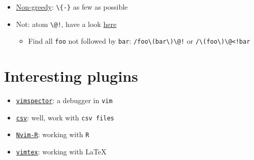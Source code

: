 \documentclass[a4paper,12pt,%
              final%
              ]{article}
\newcommand{\vim}{\texttt{vim}}
\begin{document}
\begin{itemize}
\begin{itemize}
      \item \href{http://vimregex.com/#Non-Greedy}{Non-greedy}: \verb|\{-}| as few as possible
      \item Not: atom \verb|\@!|, have a look \href{https://vim.fandom.com/wiki/Search_for_lines_not_containing_pattern_and_other_helpful_searches}{here}
        \begin{itemize}
          \item Find all \texttt{foo} not followed by \texttt{bar}: \verb|/foo\(bar\)\@!| or \verb|/\(foo\)\@<!bar|
        \end{itemize}
    \end{itemize}
\end{itemize}
%
\section{Interesting plugins}
\begin{itemize}
  \item \href{https://github.com/puremourning/vimspector}{\texttt{vimspector}}: a
    debugger in \vim{}
  \item \href{https://github.com/chrisbra/csv.vim}{\texttt{csv}}: well, work with \texttt{csv files}
  \item \href{https://github.com/jalvesaq/Nvim-R}{\texttt{Nvim-R}}: working with \texttt{R}
  \item \href{https://github.com/lervag/vimtex}{\texttt{vimtex}}: working with \LaTeX{}
\end{itemize}
%
%
\end{document}
